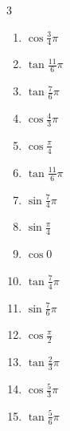 \begin{multicols}{3}
\begin{enumerate}
  \item $\displaystyle \cos{\frac{3}{4}\pi}$

  \item $\displaystyle \tan{\frac{11}{6}\pi}$

  \item $\displaystyle \tan{\frac{7}{6}\pi}$

  \item $\displaystyle \cos{\frac{4}{3}\pi}$

  \item $\displaystyle \cos{\frac{\pi}{4}}$

  \item $\displaystyle \tan{\frac{11}{6}\pi}$

  \item $\displaystyle \sin{\frac{7}{4}\pi}$

  \item $\displaystyle \sin{\frac{\pi}{4}}$

  \item $\displaystyle \cos{0}$
        \phantom{$\displaystyle =1$}

  \item $\displaystyle \tan{\frac{7}{4}\pi}$
        \phantom{$\displaystyle =-1$}

  \item $\displaystyle \sin{\frac{7}{6}\pi}$

  \item $\displaystyle \cos{\frac{\pi}{2}}$
        \phantom{$\displaystyle =0$}

  \item $\displaystyle \tan{\frac{2}{3}\pi}$

  \item $\displaystyle \cos{\frac{5}{3}\pi}$

  \item $\displaystyle \tan{\frac{5}{6}\pi}$


\end{enumerate}
\end{multicols}
